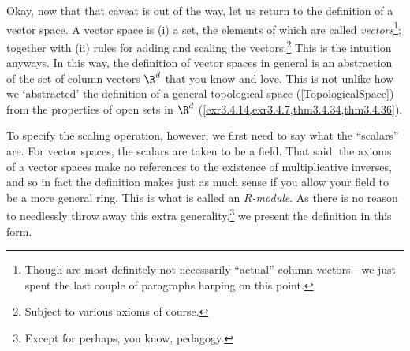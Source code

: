 Okay, now that that caveat is out of the way, let us return to the definition of a vector space.  A vector space is (i) a set, the elements of which are called \emph{vectors}\footnote{Though are most definitely not necessarily ``actual'' column vectors---we just spent the last couple of paragraphs harping on this point.}; together with (ii) rules for adding and scaling the vectors.\footnote{Subject to various axioms of course.}  This is the intuition anyways.  In this way, the definition of vector spaces in general is an abstraction of the set of column vectors $\R ^d$ that you know and love.  This is not unlike how we `abstracted' the definition of a general topological space (\cref{TopologicalSpace}) from the properties of open sets in $\R ^d$ (\cref{exr3.4.14,exr3.4.7,thm3.4.34,thm3.4.36}).

To specify the scaling operation, however, we first need to say what the ``scalars'' are.  For vector spaces, the scalars are taken to be a field.  That said, the axioms of a vector spaces make no references to the existence of multiplicative inverses, and so in fact the definition makes just as much sense if you allow your field to be a more general ring.  This is what is called an \emph{$R$-module}.  As there is no reason to needlessly throw away this extra generality,\footnote{Except for perhaps, you know, pedagogy.} we present the definition in this form.
